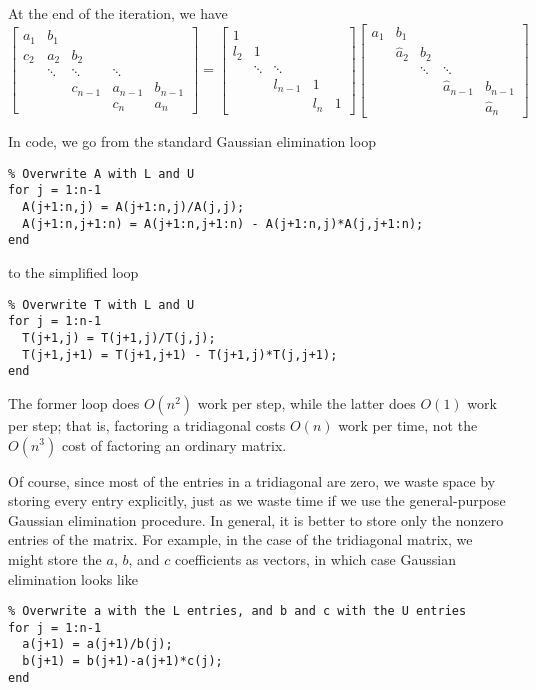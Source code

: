 \documentclass[12pt, leqno]{article}
\begin{document}
At the end of the iteration, we have
\[
  \begin{bmatrix}
  a_1 & b_1 \\
  c_2 & a_2 & b_2 \\
      & \ddots & \ddots & \ddots \\
      &        & c_{n-1} & a_{n-1} & b_{n-1} \\
      &        &        & c_n     & a_n
  \end{bmatrix} =
  \begin{bmatrix}
  1 & \\
  l_2 & 1 &  \\
      & \ddots & \ddots & \\
      &        & l_{n-1} & 1 \\
      &        &        & l_n     & 1
  \end{bmatrix}
  \begin{bmatrix}
  a_1 & b_1 \\
      & \hat{a}_2 & b_2 \\
      &      & \ddots & \ddots \\
      &        &      & \hat{a}_{n-1} & b_{n-1} \\
      &        &        &     & \hat{a}_n
  \end{bmatrix}
\]

In code, we go from the standard Gaussian elimination loop
\begin{lstlisting}
% Overwrite A with L and U
for j = 1:n-1
  A(j+1:n,j) = A(j+1:n,j)/A(j,j);
  A(j+1:n,j+1:n) = A(j+1:n,j+1:n) - A(j+1:n,j)*A(j,j+1:n);
end
\end{lstlisting}
to the simplified loop
\begin{lstlisting}
% Overwrite T with L and U
for j = 1:n-1
  T(j+1,j) = T(j+1,j)/T(j,j);
  T(j+1,j+1) = T(j+1,j+1) - T(j+1,j)*T(j,j+1);
end
\end{lstlisting}
The former loop does $O(n^2)$ work per step, while the latter does
$O(1)$ work per step; that is, factoring a tridiagonal costs $O(n)$
work per time, not the $O(n^3)$ cost of factoring an ordinary matrix.

Of course, since most of the entries in a tridiagonal are zero,
we waste space by storing every entry explicitly, just as we waste
time if we use the general-purpose Gaussian elimination procedure.
In general, it is better to store only the nonzero entries of the
matrix.  For example, in the case of the tridiagonal matrix,
we might store the $a$, $b$, and $c$ coefficients as vectors,
in which case Gaussian elimination looks like
\begin{lstlisting}
% Overwrite a with the L entries, and b and c with the U entries
for j = 1:n-1
  a(j+1) = a(j+1)/b(j);
  b(j+1) = b(j+1)-a(j+1)*c(j);
end
\end{lstlisting}
\end{document}
